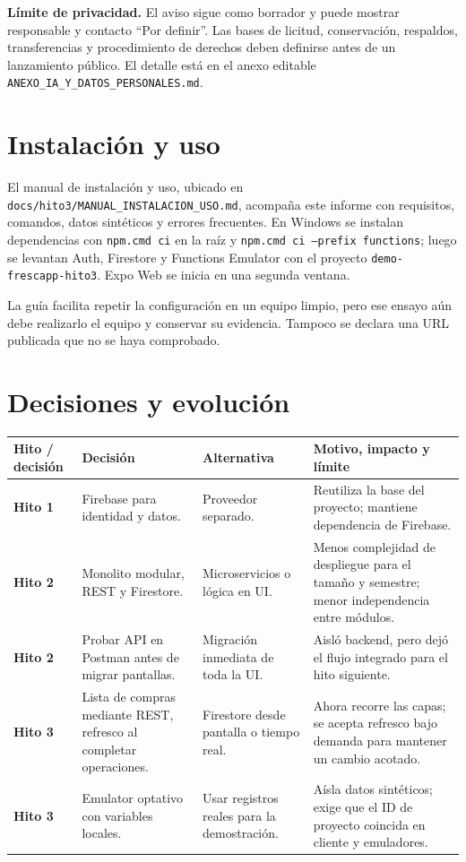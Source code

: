 \documentclass[11pt,a4paper]{article}
\newcommand{\pathcode}[1]{\texttt{\small #1}}
\begin{document}
\textbf{Límite de privacidad.} El aviso sigue como borrador y puede mostrar responsable y contacto “Por definir”. Las bases de licitud, conservación, respaldos, transferencias y procedimiento de derechos deben definirse antes de un lanzamiento público. El detalle está en el anexo editable \pathcode{ANEXO\_IA\_Y\_DATOS\_PERSONALES.md}.

\section{Instalación y uso}
El manual de instalación y uso, ubicado en \pathcode{docs/hito3/MANUAL\_INSTALACION\_USO.md}, acompaña este informe con requisitos, comandos, datos sintéticos y errores frecuentes. En Windows se instalan dependencias con \pathcode{npm.cmd ci} en la raíz y \pathcode{npm.cmd ci --prefix functions}; luego se levantan Auth, Firestore y Functions Emulator con el proyecto \pathcode{demo-frescapp-hito3}. Expo Web se inicia en una segunda ventana.

La guía facilita repetir la configuración en un equipo limpio, pero ese ensayo aún debe realizarlo el equipo y conservar su evidencia. Tampoco se declara una URL publicada que no se haya comprobado.

\section{Decisiones y evolución}
\begin{tabularx}{\textwidth}{>{\bfseries}p{2.55cm}p{3.25cm}YY}
Hito / decisión & Decisión & Alternativa & Motivo, impacto y límite\\
\midrule
Hito 1 & Firebase para identidad y datos. & Proveedor separado. & Reutiliza la base del proyecto; mantiene dependencia de Firebase.\\
Hito 2 & Monolito modular, REST y Firestore. & Microservicios o lógica en UI. & Menos complejidad de despliegue para el tamaño y semestre; menor independencia entre módulos.\\
Hito 2 & Probar API en Postman antes de migrar pantallas. & Migración inmediata de toda la UI. & Aisló backend, pero dejó el flujo integrado para el hito siguiente.\\
Hito 3 & Lista de compras mediante REST, refresco al completar operaciones. & Firestore desde pantalla o tiempo real. & Ahora recorre las capas; se acepta refresco bajo demanda para mantener un cambio acotado.\\
Hito 3 & Emulator optativo con variables locales. & Usar registros reales para la demostración. & Aísla datos sintéticos; exige que el ID de proyecto coincida en cliente y emuladores.\\
\end{tabularx}
\end{document}
